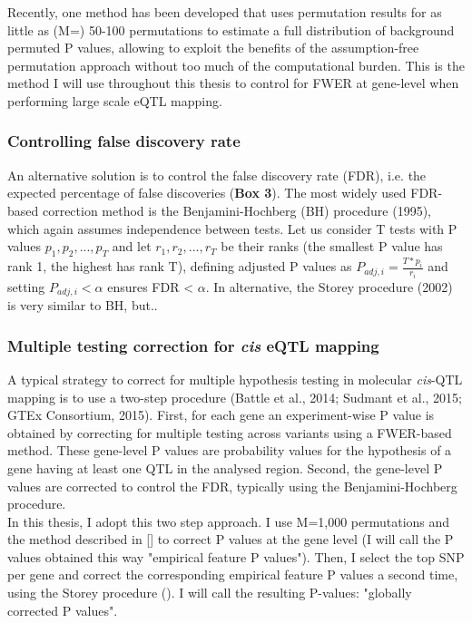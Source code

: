Recently, one method has been developed that uses permutation results for as little as (M=) 50-100 permutations to estimate a full distribution of background permuted P values, allowing to exploit the benefits of the assumption-free permutation approach without too much of the computational burden. 
This is the method I will use throughout this thesis to control for FWER at gene-level when performing large scale eQTL mapping.

\subsubsection{Controlling false discovery rate}

An alternative solution is to control the false discovery rate (FDR), i.e. the expected percentage of false discoveries (\textbf{Box 3}).
The most widely used FDR-based correction method is the Benjamini-Hochberg (BH) procedure (1995), which again assumes independence between tests. 
Let us consider T tests with P values $p_1, p_2, ..., p_T$ and let $r_1, r_2, ..., r_T$ be their ranks (the smallest P value has rank 1, the highest has rank T), defining adjusted P values as $P_{adj,i} = \frac{T*p_i}{r_i} $ and setting $P_{adj,i} <\alpha$ ensures FDR < $\alpha$.
In alternative, the Storey procedure (2002) is very similar to BH, but..

\subsubsection{Multiple testing correction for \textit{cis} eQTL mapping}

A typical strategy to correct for multiple hypothesis testing in molecular \textit{cis}-QTL mapping is to use a two-step procedure (Battle et al., 2014; Sudmant et al., 2015; GTEx
Consortium, 2015). 
First, for each gene an experiment-wise P value is obtained by correcting for multiple testing across variants using a FWER-based method. 
These gene-level P values are probability values for the hypothesis of a gene having at least
one QTL in the analysed region. 
Second, the gene-level P values are corrected to control the FDR, typically using the Benjamini-Hochberg procedure.\\

In this thesis, I adopt this two step approach.
I use M=1,000 permutations and the method described in [] to correct P values at the gene level (I will call the P values obtained this way "empirical feature P values").
Then, I select the top SNP per gene and correct the corresponding empirical feature P values a second time, using the Storey procedure ().
I will call the resulting P-values: "globally corrected P values".

